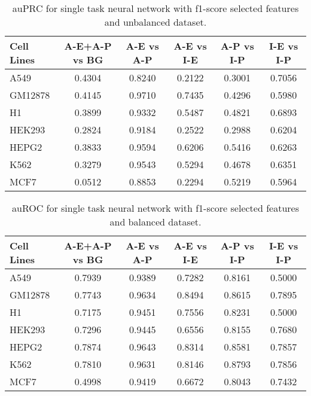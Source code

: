 \begin{table}[!htbp]
\centering
\caption{auPRC for single task neural network with f1-score selected features and unbalanced dataset.}
\label{tab:unbalanced_new_auprc}
\begin{tabular}[t]{l*{5}{c}}
\toprule
Cell Lines & A-E+A-P vs BG & A-E vs A-P & A-E vs I-E & A-P vs I-P & I-E vs I-P \\
\midrule
A549  & 0.4304 & 0.8240 & 0.2122 & 0.3001 & 0.7056\\
GM12878  & 0.4145 & 0.9710 & 0.7435 & 0.4296 & 0.5980\\
H1  & 0.3899 & 0.9332 & 0.5487 & 0.4821 & 0.6893\\
HEK293  & 0.2824 & 0.9184 & 0.2522 & 0.2988 & 0.6204\\
HEPG2  & 0.3833 & 0.9594 & 0.6206 & 0.5416 & 0.6263\\
K562  & 0.3279 & 0.9543 & 0.5294 & 0.4678 & 0.6351\\
MCF7  & 0.0512 & 0.8853 & 0.2294 & 0.5219 & 0.5964\\
\bottomrule
\end{tabular}
\end{table}
\begin{table}[!htbp]
\centering
\caption{auROC for single task neural network with f1-score selected features and balanced dataset.}
\label{tab:balanced_new_auroc}
\begin{tabular}[t]{l*{5}{c}}
\toprule
Cell Lines & A-E+A-P vs BG & A-E vs A-P & A-E vs I-E & A-P vs I-P & I-E vs I-P \\
\midrule
A549  & 0.7939 & 0.9389 & 0.7282 & 0.8161 & 0.5000\\
GM12878  & 0.7743 & 0.9634 & 0.8494 & 0.8615 & 0.7895\\
H1  & 0.7175 & 0.9451 & 0.7556 & 0.8231 & 0.5000\\
HEK293  & 0.7296 & 0.9445 & 0.6556 & 0.8155 & 0.7680\\
HEPG2  & 0.7874 & 0.9643 & 0.8314 & 0.8581 & 0.7857\\
K562  & 0.7810 & 0.9631 & 0.8146 & 0.8793 & 0.7856\\
MCF7  & 0.4998 & 0.9419 & 0.6672 & 0.8043 & 0.7432\\
\bottomrule
\end{tabular}
\end{table}

